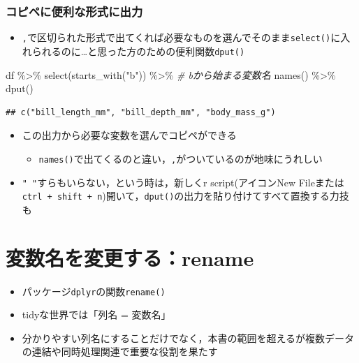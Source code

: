 \documentclass[
  xelatex,ja=standard, b5paper]{bxjsbook}
\newenvironment{Shaded}{\begin{snugshade}}{\end{snugshade}}
\newcommand{\CommentTok}[1]{\textcolor[rgb]{0.56,0.35,0.01}{\textit{#1}}}
\newcommand{\FunctionTok}[1]{\textcolor[rgb]{0.00,0.00,0.00}{#1}}
\newcommand{\NormalTok}[1]{#1}
\newcommand{\SpecialCharTok}[1]{\textcolor[rgb]{0.00,0.00,0.00}{#1}}
\newcommand{\StringTok}[1]{\textcolor[rgb]{0.31,0.60,0.02}{#1}}
\providecommand{\tightlist}{%
  \setlength{\itemsep}{0pt}\setlength{\parskip}{0pt}}
\begin{document}
\hypertarget{select-get-out}{%
\subsection{コピペに便利な形式に出力}\label{select-get-out}}

\begin{itemize}
\tightlist
\item
  \texttt{,}で区切られた形式で出てくれば必要なものを選んでそのまま\texttt{select()}に入れられるのに\ldots と思った方のための便利関数\texttt{dput()}
\end{itemize}

\begin{Shaded}
\begin{Highlighting}[]
\NormalTok{df }\SpecialCharTok{\%\textgreater{}\%} 
  \FunctionTok{select}\NormalTok{(}\FunctionTok{starts\_with}\NormalTok{(}\StringTok{"b"}\NormalTok{)) }\SpecialCharTok{\%\textgreater{}\%} \CommentTok{\# bから始まる変数名}
  \FunctionTok{names}\NormalTok{() }\SpecialCharTok{\%\textgreater{}\%} 
  \FunctionTok{dput}\NormalTok{()}
\end{Highlighting}
\end{Shaded}

\begin{verbatim}
## c("bill_length_mm", "bill_depth_mm", "body_mass_g")
\end{verbatim}

\begin{itemize}
\tightlist
\item
  この出力から必要な変数を選んでコピペができる

  \begin{itemize}
  \tightlist
  \item
    \texttt{names()}で出てくるのと違い，\texttt{,}がついているのが地味にうれしい
  \end{itemize}
\item
  \texttt{"\ "}すらもいらない，という時は，新しくr script(アイコンNew Fileまたは\texttt{ctrl\ +\ shift\ +\ n})開いて，\texttt{dput()}の出力を貼り付けてすべて置換する力技も
\end{itemize}

\hypertarget{rename}{%
\chapter{変数名を変更する：rename}\label{rename}}

\begin{itemize}
\tightlist
\item
  パッケージ\texttt{dplyr}の関数\texttt{rename()}
\item
  tidyな世界では「列名 = 変数名」
\item
  分かりやすい列名にすることだけでなく，本書の範囲を超えるが複数データの連結や同時処理関連で重要な役割を果たす
\end{itemize}
\end{document}
